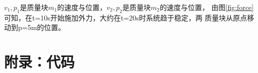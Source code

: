 \documentclass[UTF8]{ctexart}
\begin{document}
$ v_1,p_1 $是质量块$ m_1 $的速度与位置，$ v_2,p_2 $是质量块$ m_2 $的速度与位置，
由图\ref{fig:force}可知，在t=10s开始施加外力，大约在t=20s时系统趋于稳定，两
质量块从原点移动到p=5m的位置。

\newpage
\appendix
\vspace{.5in}
\section{附录：代码}

\end{document}
